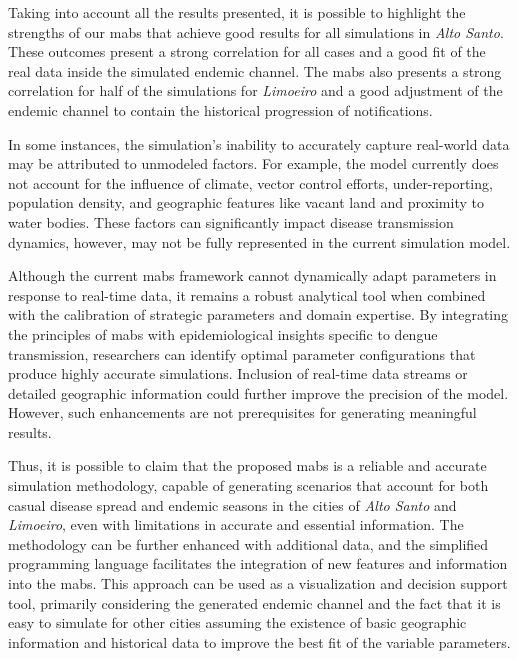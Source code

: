 Taking into account all the results presented, it is possible to highlight the strengths of our \gls{mabs} that achieve good results for all simulations in \textit{Alto Santo}. These outcomes present a strong correlation for all cases and a good fit of the real data inside the simulated endemic channel.
The \gls{mabs} also presents a strong correlation for half of the simulations for \textit{Limoeiro} and a good adjustment of the endemic channel to contain the historical progression of notifications. 

In some instances, the simulation's inability to accurately capture real-world data may be attributed to unmodeled factors. For example, the model currently does not account for the influence of climate, vector control efforts, under-reporting, population density, and geographic features like vacant land and proximity to water bodies. These factors can significantly impact disease transmission dynamics, however, may not be fully represented in the current simulation model.

Although the current \gls{mabs} framework cannot dynamically adapt parameters in response to real-time data, it remains a robust analytical tool when combined with the calibration of strategic parameters and domain expertise. By integrating the principles of \gls{mabs} with epidemiological insights specific to dengue transmission, researchers can identify optimal parameter configurations that produce highly accurate simulations. Inclusion of real-time data streams or detailed geographic information could further improve the precision of the model. However, such enhancements are not prerequisites for generating meaningful results.

Thus, it is possible to claim that the proposed \gls{mabs} is a reliable and accurate simulation methodology, capable of generating scenarios that account for both casual disease spread and endemic seasons in the cities of \textit{Alto Santo} and \textit{Limoeiro}, even with limitations in accurate and essential information. The methodology can be further enhanced with additional data, and the simplified programming language facilitates the integration of new features and information into the \gls{mabs}. This approach can be used as a visualization and decision support tool, primarily considering the generated endemic channel and the fact that it is easy to simulate for other cities assuming the existence of basic geographic information and historical data to improve the best fit of the variable parameters.

